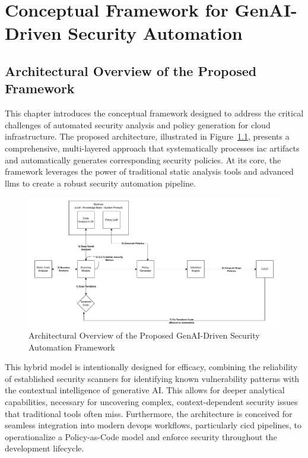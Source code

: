 \chapter{Conceptual Framework for GenAI-Driven Security Automation}


\section{Architectural Overview of the Proposed Framework}

This chapter introduces the conceptual framework designed to address the critical challenges of automated security analysis and policy generation for cloud infrastructure. The proposed architecture, illustrated in Figure~\ref{fig:prototype-architecture}, presents a comprehensive, multi-layered approach that systematically processes \gls{iac} artifacts and automatically generates corresponding security policies. At its core, the framework leverages the power of traditional static analysis tools and advanced \glspl{llm} to create a robust security automation pipeline.
\begin{figure}[htbp]
\centering
\includegraphics[width=\textwidth]{Figures/prototype.pdf}
\caption{Architectural Overview of the Proposed GenAI-Driven Security Automation Framework}
\label{fig:prototype-architecture}
\end{figure}

This hybrid model is intentionally designed for efficacy, combining the reliability of established security scanners for identifying known vulnerability patterns with the contextual intelligence of generative AI. This allows for deeper analytical capabilities, necessary for uncovering complex, context-dependent security issues that traditional tools often miss. Furthermore, the architecture is conceived for seamless integration into modern \gls{devops} workflows, particularly \gls{cicd} pipelines, to operationalize a Policy-as-Code model and enforce security throughout the development lifecycle.

